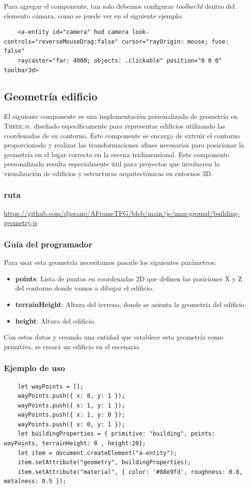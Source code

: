 \documentclass[a4paper, 11pt]{book}
\begin{document}
Para agregar el componente, tan solo debemos configurar \emph{toolbar3d} dentro del elemento cámara, como se puede ver en el siguiente ejemplo:
\begin{verbatim}
	<a-entity id="camera" hud camera look-controls="reverseMouseDrag:false" cursor="rayOrigin: mouse; fuse: false"
	raycaster="far: 4000; objects: .clickable" position="0 0 0" toolbar3d>
\end{verbatim}
\subsection{Geometría edificio}
El siguiente componente es una implementación personalizada de geometría en \textsc{Three.js}, diseñado específicamente para representar edificios utilizando las coordenadas de su contorno. Este componente se encarga de extruir el contorno proporcionado y realizar las transformaciones afines necesarias para posicionar la geometría en el lugar correcto en la escena tridimensional.
Este componente personalizado resulta especialmente útil para proyectos que involucren la visualización de edificios y estructuras arquitectónicas en entornos 3D.
\subsubsection{ruta}
{\scriptsize
	\url{https://github.com/djprano/AFrameTFG/blob/main/js/map-ground/building-geometry.js}
}
\subsubsection{Guía del programador}
Para usar esta geometría necesitamos pasarle los siguientes parámetros:
\begin{itemize}
	\item \textbf{points}: Lista de puntos en coordenadas 2D que definen las posiciones X y Z del contorno donde vamos a dibujar el edificio.
	\item \textbf{terrainHeight}: Altura del terreno, donde se asienta la geometría del edificio.
	\item \textbf{height}: Altura del edificio.
\end{itemize}
Con estos datos y creando una entidad que establece esta geometría como primitiva, se creará un edificio en el escenario.
\subsubsection{Ejemplo de uso}
\begin{verbatim}
	let wayPoints = [];
	wayPoints.push({ x: 0, y: 1 });
	wayPoints.push({ x: 1, y: 1 });
	wayPoints.push({ x: 1, y: 0 });
	wayPoints.push({ x: 0, y: 1 });
	let buildingProperties = { primitive: "building", points: wayPoints, terrainHeight: 0 , height:20};
	let item = document.createElement("a-entity");
	item.setAttribute("geometry", buildingProperties);
	item.setAttribute("material", { color: '#88e9fd', roughness: 0.8, metalness: 0.5 });
	
\end{verbatim}
\end{document}
